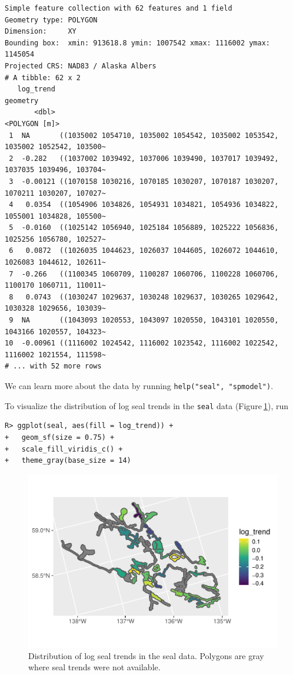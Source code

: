\documentclass{article}
\begin{document}
\begin{verbatim}
Simple feature collection with 62 features and 1 field
Geometry type: POLYGON
Dimension:     XY
Bounding box:  xmin: 913618.8 ymin: 1007542 xmax: 1116002 ymax: 1145054
Projected CRS: NAD83 / Alaska Albers
# A tibble: 62 x 2
   log_trend                                                                      geometry
       <dbl>                                                                 <POLYGON [m]>
 1  NA       ((1035002 1054710, 1035002 1054542, 1035002 1053542, 1035002 1052542, 103500~
 2  -0.282   ((1037002 1039492, 1037006 1039490, 1037017 1039492, 1037035 1039496, 103704~
 3  -0.00121 ((1070158 1030216, 1070185 1030207, 1070187 1030207, 1070211 1030207, 107027~
 4   0.0354  ((1054906 1034826, 1054931 1034821, 1054936 1034822, 1055001 1034828, 105500~
 5  -0.0160  ((1025142 1056940, 1025184 1056889, 1025222 1056836, 1025256 1056780, 102527~
 6   0.0872  ((1026035 1044623, 1026037 1044605, 1026072 1044610, 1026083 1044612, 102611~
 7  -0.266   ((1100345 1060709, 1100287 1060706, 1100228 1060706, 1100170 1060711, 110011~
 8   0.0743  ((1030247 1029637, 1030248 1029637, 1030265 1029642, 1030328 1029656, 103039~
 9  NA       ((1043093 1020553, 1043097 1020550, 1043101 1020550, 1043166 1020557, 104323~
10  -0.00961 ((1116002 1024542, 1116002 1023542, 1116002 1022542, 1116002 1021554, 111598~
# ... with 52 more rows
\end{verbatim}

We can learn more about the data by running
\texttt{help("seal",\ "spmodel")}.

To visualize the distribution of log seal trends in the \texttt{seal}
data (Figure\(~\)\ref{fig:log_trend}), run

\begin{verbatim}
R> ggplot(seal, aes(fill = log_trend)) +
+   geom_sf(size = 0.75) +
+   scale_fill_viridis_c() +
+   theme_gray(base_size = 14)
\end{verbatim}

\begin{figure}

{\centering \includegraphics[width=0.65\linewidth]{preprint_files/figure-latex/log_trend-1} 

}

\caption{Distribution of log seal trends in the seal data. Polygons are gray where seal trends were not available.}\label{fig:log_trend}
\end{figure}
\end{document}
